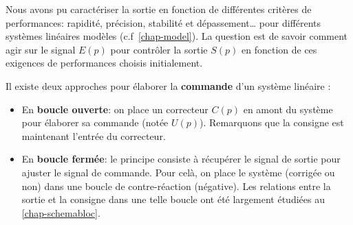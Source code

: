 Nous avons pu caractériser la sortie en fonction de différentes 
critères de performances: rapidité, précision, stabilité et dépassement\ldots
pour différents systèmes linéaires modèles (c.f~\cref{chap-model}). 
La question est de savoir comment agir sur le 
signal $E(p)$ pour contrôler la sortie $S(p)$ en fonction de 
ces exigences de performances choisis initialement.

Il existe deux approches pour élaborer la \textbf{commande} 
d'un système linéaire :%

\begin{itemize}
    \item En \textbf{boucle ouverte}: on place un correcteur $C(p)$
          en amont du système pour élaborer 
          sa commande (notée $U(p)$).
          Remarquons que la consigne est maintenant
          l'entrée du correcteur.

%                                      
%                                      
%
\begin{center}
\end{center}

    \item En \textbf{boucle fermée}: le principe consiste à récupérer 
          le signal de sortie pour ajuster le signal de commande. 
          Pour celà, on place le système (corrigée ou non) dans une 
          boucle de contre-réaction (négative). 
          Les relations entre la sortie et la consigne dans une telle 
          boucle ont été largement étudiées au \cref{chap-schemabloc}.


\end{itemize}
